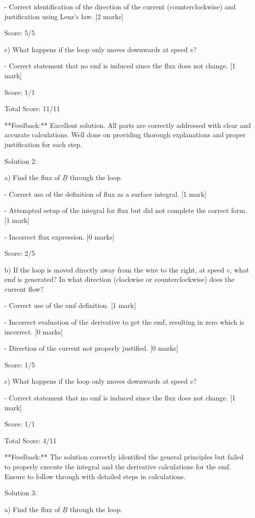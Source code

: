 \documentclass[a4paper,11pt]{article}
\begin{document}
- Correct identification of the direction of the current (counterclockwise) and justification using Lenz's law. [2 marks]

Score: 5/5

c) What happens if the loop only moves downwards at speed \( v \)?

- Correct statement that no emf is induced since the flux does not change. [1 mark]

Score: 1/1

Total Score: 11/11

**Feedback:** Excellent solution. All parts are correctly addressed with clear and accurate calculations. Well done on providing thorough explanations and proper justification for each step.

Solution 2: 

a) Find the flux of \( \underline{B} \) through the loop.

- Correct use of the definition of flux as a surface integral. [1 mark]

- Attempted setup of the integral for flux but did not complete the correct form. [1 mark]

- Incorrect flux expression. [0 marks]

Score: 2/5

b) If the loop is moved directly away from the wire to the right, at speed \( v \), what emf is generated? In what direction (clockwise or counterclockwise) does the current flow?

- Correct use of the emf definition. [1 mark]

- Incorrect evaluation of the derivative to get the emf, resulting in zero which is incorrect. [0 marks]

- Direction of the current not properly justified. [0 marks]

Score: 1/5

c) What happens if the loop only moves downwards at speed \( v \)?

- Correct statement that no emf is induced since the flux does not change. [1 mark]

Score: 1/1

Total Score: 4/11

**Feedback:** The solution correctly identified the general principles but failed to properly execute the integral and the derivative calculations for the emf. Ensure to follow through with detailed steps in calculations.

Solution 3: 

a) Find the flux of \( \underline{B} \) through the loop.
\end{document}
